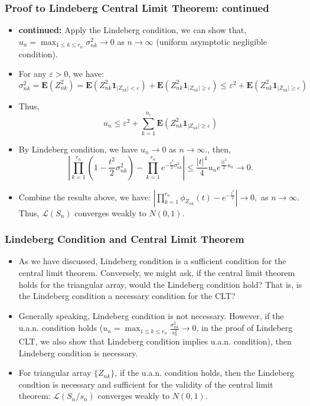 \documentclass[handout]{beamer}
\newcommand{\BE}{\mathbf{E}}
\newcommand{\BI}{\mathbf{1}}
\begin{document}
      \frame
{
  \frametitle{Proof to Lindeberg Central Limit Theorem: continued}
   \begin{itemize}

\item<1->\textbf{continued:}  Apply the Lindeberg condition, we can show that, $u_n=\max_{1\leq k\leq r_n} \sigma_{nk}^2 \rightarrow 0$ as $n\rightarrow \infty$ (uniform asymptotic negligible condition).

\item<2->[-] For any $\varepsilon>0$, we have:
$$\sigma_{nk}^2=\BE(Z_{nk}^2)=\BE(Z_{nk}^2 \BI_{|Z_{nk}|<\varepsilon})+\BE(Z_{nk}^2 \BI_{|Z_{nk}|\geq \varepsilon}) \leq \varepsilon^2+ \BE(Z_{nk}^2 \BI_{|Z_{nk}|\geq \varepsilon}) $$
\item<3->[-] Thus,
$$u_n\leq \varepsilon^2+ \sum_{k=1}^{n_r} \BE(Z_{nk}^2 \BI_{|Z_{nk}|\geq \varepsilon}) $$

\item<4->[-] By Lindeberg condition, we have $u_n\rightarrow 0$ as $n\rightarrow \infty.$, then,
$$|\prod_{k=1}^{r_n} (1-\frac{t^2}{2} \sigma^2_{nk})-\prod_{k=1}^{r_n} e^{-\frac{t^2}{2}\sigma^2_{nk}}| \leq \frac{|t|^4}{4} u_n  e^{\frac{|t|^2}{2} u_n} \rightarrow 0.$$

\item<5->[-] Combine the results above, we have: $ |\prod_{k=1}^{r_n} \phi_{Z_{nk}}(t)-e^{-\frac{t^2}{2}}| \rightarrow 0, $
as $n\rightarrow \infty$. Thus, $\mathcal{L} (S_n)$ converges weakly to $N(0,1)$.


 
\end{itemize}
}


      \frame
{
  \frametitle{Lindeberg Condition and Central Limit Theorem}
   \begin{itemize}

\item<1-> As we have discussed,  Lindeberg condition is a sufficient condition for the central limit theorem. Conversely, we might ask, if 
the central limit theorem holds for the triangular array, would the Lindeberg condition hold? That is, is the Lindeberg condition a necessary condition for the CLT? 

\item<2-> Generally speaking, Lindeberg condition is not necessary. However, if the u.a.n. condition holds ($u_n=\max_{1\leq k\leq r_n} \frac{\sigma_{nk}^2}{s_n^2} \rightarrow 0$, in the proof of Lindeberg CLT, we also show that Lindeberg condition implies u.a.n. condition), then Lindeberg condition is necessary. 

\item<3->[] \begin{Theorem} For triangular array $\{Z_{nk}\}$, if the u.a.n. condition holds, then the Lindeberg condtion is necessary and sufficient for the validity of the central limit theorem: $\mathcal{L} (S_n/s_n)$ converges weakly to $N(0,1)$.

\end{Theorem}

 
\end{itemize}
}
\end{document}
